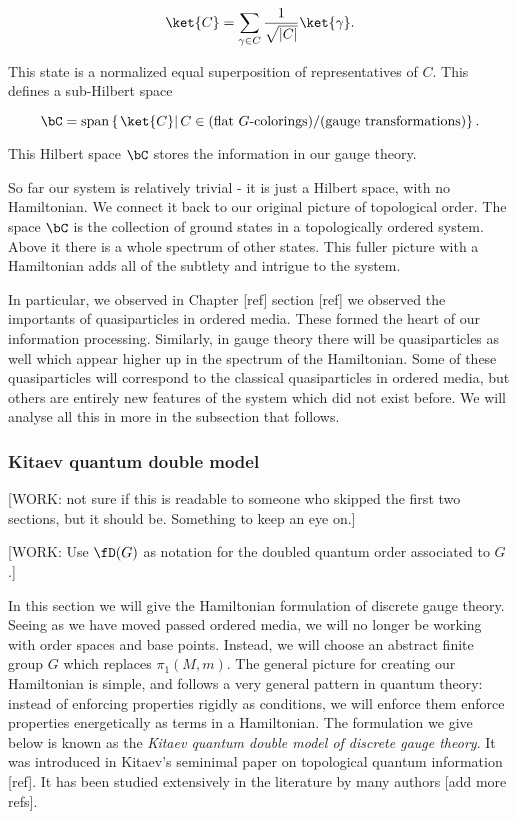 $$\ket{C}=\sum_{\gamma \in C}\frac{1}{\sqrt{|C|}}\ket{\gamma}.$$

This state is a normalized equal superposition of representatives of $C$. This defines a sub-Hilbert space

$$\bC=\text{span}\left\{\left.\ket{C}\right| C\in \text{(flat $G$-colorings)}/\text{(gauge transformations)}\right\}.$$

This Hilbert space $\bC$ stores the information in our gauge theory.

So far our system is relatively trivial - it is just a Hilbert space, with no Hamiltonian. We connect it back to our original picture of topological order. The space $\bC$ is the collection of ground states in a topologically ordered system. Above it there is a whole spectrum of other states. This fuller picture with a Hamiltonian adds all of the subtlety and intrigue to the system.

In particular, we observed in Chapter [ref] section [ref] we observed the importants of quasiparticles in ordered media. These formed the heart of our information processing. Similarly, in gauge theory there will be quasiparticles as well which appear higher up in the spectrum of the Hamiltonian. Some of these quasiparticles will correspond to the classical quasiparticles in ordered media, but others are entirely new features of the system which did not exist before. We will analyse all this in more in the subsection that follows.

\subsubsection{Kitaev quantum double model}

[WORK: not sure if this is readable to someone who skipped the first two sections, but it should be. Something to keep an eye on.]

[WORK: Use $\fD(G)$ as notation for the doubled quantum order associated to $G$.]

In this section we will give the Hamiltonian formulation of discrete gauge theory. Seeing as we have moved passed ordered media, we will no longer be working with order spaces and base points. Instead, we will choose an abstract finite group $G$ which replaces $\pi_1(M,m)$. The general picture for creating our Hamiltonian is simple, and follows a very general pattern in quantum theory: instead of enforcing properties rigidly as conditions, we will enforce them enforce properties energetically as terms in a Hamiltonian. The formulation we give below is known as the \textit{Kitaev quantum double model of discrete gauge theory}. It was introduced in Kitaev's seminimal paper on topological quantum information [ref]. It has been studied extensively in the literature by many authors [add more refs].

